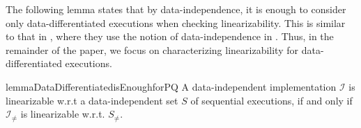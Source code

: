 The following lemma states that by data-independence, it is enough to consider only data-differentiated executions when checking linearizability. This is similar to that in \cite{conf/tacas/AbdullaHHJR13,DBLP:conf/icalp/BouajjaniEEH15}, where they use the notion of data-independence in \cite{conf/popl/Wolper86}. Thus, in the remainder of the paper, we focus on characterizing linearizability for data-differentiated executions. %

\begin{restatable}{lemma}{DataDifferentiatedisEnoughforPQ}
\label{lemma:data differentiated is enough for PQ}
A data-independent implementation $\mathcal{I}$ is linearizable w.r.t a data-independent set $S$ of sequential executions, if and only if $\mathcal{I}_{\neq}$ is linearizable w.r.t. $S_{\neq}$.
\end{restatable}


